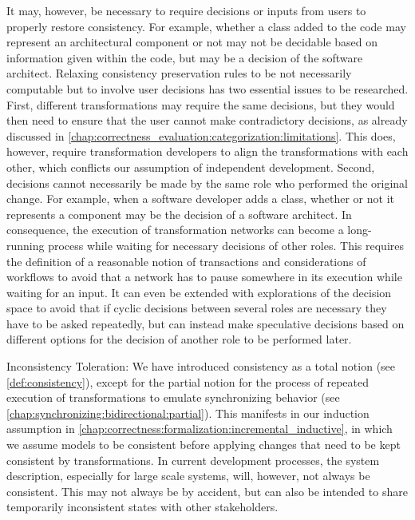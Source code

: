 \begin{properdescription}
It may, however, be necessary to require decisions or inputs from users to properly restore consistency.
For example, whether a class added to the code may represent an architectural component or not may not be decidable based on information given within the code, but may be a decision of the software architect.
Relaxing consistency preservation rules to be not necessarily computable but to involve user decisions has two essential issues to be researched.
First, different transformations may require the same decisions, but they would then need to ensure that the user cannot make contradictory decisions, as already discussed in \autoref{chap:correctness_evaluation:categorization:limitations}.
This does, however, require transformation developers to align the transformations with each other, which conflicts our assumption of independent development.
Second, decisions cannot necessarily be made by the same role who performed the original change.
For example, when a software developer adds a class, whether or not it represents a component may be the decision of a software architect.
In consequence, the execution of transformation networks can become a long-running process while waiting for necessary decisions of other roles.
This requires the definition of a reasonable notion of transactions and considerations of workflows to avoid that a network has to pause somewhere in its execution while waiting for an input.
It can even be extended with explorations of the decision space to avoid that if cyclic decisions between several roles are necessary they have to be asked repeatedly, but can instead make speculative decisions based on different options for the decision of another role to be performed later.
\item[Inconsistency Toleration:]
We have introduced consistency as a total notion (see \autoref{def:consistency}), except for the partial notion for the process of repeated execution of transformations to emulate synchronizing behavior (see \autoref{chap:synchronizing:bidirectional:partial}).
This manifests in our induction assumption in \autoref{chap:correctness:formalization:incremental_inductive}, in which we assume models to be consistent before applying changes that need to be kept consistent by transformations.
In current development processes, the system description, especially for large scale systems, will, however, not always be consistent.
This may not always be by accident, but can also be intended to share temporarily inconsistent states with other stakeholders. 

\end{properdescription}
